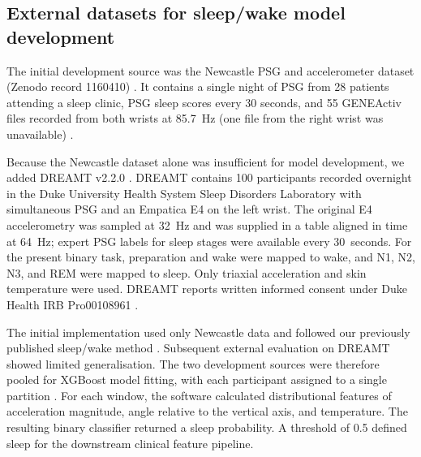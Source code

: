 \documentclass[referee,pdflatex,sn-vancouver-num]{sn-jnl}
\begin{document}

\subsection{External datasets for sleep/wake model development}\label{subsec:sleep-model-data}

The initial development source was the Newcastle PSG and accelerometer dataset
(Zenodo record 1160410) \cite{vanhees2018newcastle}. It contains a single night
of PSG from 28 patients attending a sleep clinic, PSG sleep scores every 30 seconds,
and 55 GENEActiv files recorded from both wrists at 85.7~Hz (one file from the right wrist
was unavailable) \cite{vanhees2015sleep}.

Because the Newcastle dataset alone was insufficient for model development, we
added DREAMT v2.2.0 \cite{wang2026dreamt,wang2024wearable}. DREAMT contains 100
participants recorded overnight in the Duke University Health System Sleep
Disorders Laboratory with simultaneous PSG and an Empatica E4 on the left wrist. The
original E4 accelerometry was sampled at 32~Hz and was supplied in a
table aligned in time at 64~Hz; expert PSG labels for sleep stages were available every
30~seconds. For the present binary task, preparation and wake were mapped to
wake, and N1, N2, N3, and REM were mapped to sleep. Only triaxial acceleration
and skin temperature were used. DREAMT reports written informed consent under
Duke Health IRB Pro00108961 \cite{wang2026dreamt}.

The initial implementation used only Newcastle data and followed our previously published
sleep/wake method \cite{mikulec2022prodromal}. Subsequent external evaluation
on DREAMT showed limited generalisation. The two development sources were
therefore pooled for XGBoost model fitting, with each participant assigned to a single partition
\cite{chen2016xgboost}. For each window, the
software calculated distributional features of acceleration magnitude,
angle relative to the vertical axis, and temperature. The resulting binary classifier returned
a sleep probability. A threshold of 0.5 defined sleep for the downstream
clinical feature pipeline.
\end{document}
